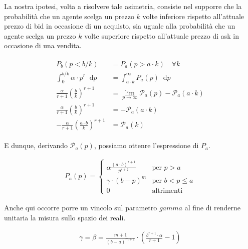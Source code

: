 \documentclass[paper=a4, fontsize=11pt]{scrartcl}
\newcommand*\diff{\mathop{}\!\mathrm{d}}
\numberwithin{equation}{section}
\numberwithin{figure}{section}
\numberwithin{table}{section}
\begin{document}
La nostra ipotesi, volta a risolvere tale asimetria, consiste nel supporre che la probabilità che un agente scelga un prezzo $k$ volte inferiore rispetto all'attuale prezzo di bid in occasione di un acquisto, sia uguale alla probabilità che un agente scelga un prezzo $k$ volte superiore rispetto all'attuale prezzo di ask in occasione di una vendita.

\begin{align}
\begin{split}
P_b(p < b / k) & = P_a(p > a \cdot k) \quad \forall k \\
\int_0^{b/k} \alpha \cdot p^r \diff p & = \int_{a \cdot k}^\infty P_a(p) \diff p \\
\frac{\alpha}{r+1} \left(\frac{b}{k}\right)^{r+1} & = \lim_{p \to \infty} \mathcal{P}_a(p) - \mathcal{P}_a(a \cdot k) \\
\frac{\alpha}{r+1} \left(\frac{b}{k}\right)^{r+1} & = - \mathcal{P}_a(a \cdot k) \\
- \frac{\alpha}{r+1} \left(\frac{a \cdot b}{k}\right)^{r+1} & = \mathcal{P}_a(k)
\end{split}
\end{align}

E dunque, derivando $\mathcal{P}_a(p)$, possiamo ottenre l'espressione di $P_a$.

\begin{align}
P_a(p) = \left\{\begin{array}{ll}
         \alpha  \frac{(a \cdot b)^{r+1}}{p^{r+2}}  & \text{per } p > a \\
         \gamma  \cdot (b - p)^m                    & \text{per } b < p \leq a \\
         0   & \text{altrimenti } \end{array}\right.
\end{align}

Anche qui occorre porre un vincolo sul parametro $gamma$ al fine di renderne unitaria la misura sullo spazio dei reali.

\begin{align}
\gamma = \beta = \frac{m+1}{(b-a)^{m+1}} \cdot  \left(\frac{b^{r+1}\cdot\alpha}{r+1}-1\right)
\end{align}
\end{document}
